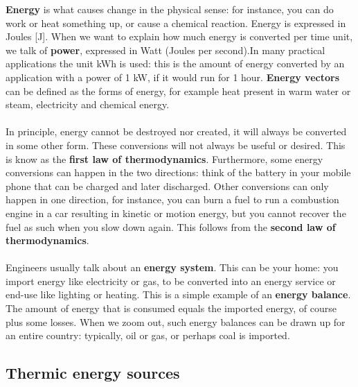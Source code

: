 \documentclass[../summary.tex]{subfiles}
\begin{document}
	\textbf{Energy} is what causes change in the physical sense: for instance, you can do work or heat something up, or cause a chemical reaction. Energy is expressed in Joules [J]. When we want to explain how much energy is converted per time unit, we talk of \textbf{power}, expressed in Watt (Joules per second).In many practical applications the unit kWh is used: this is the amount of energy converted by an application with a power of 1 kW, if it would run for 1 hour. \textbf{Energy vectors} can be defined as the forms of energy, for example heat present in warm water or steam, electricity and chemical energy.
	\\\\
	In principle, energy cannot be destroyed nor created, it will always be converted in some other form. These conversions will not always be useful or desired. This is know as the \textbf{first law of thermodynamics}. Furthermore, some energy conversions can happen in the two directions: think of the battery in your mobile phone that can be charged and later discharged. Other conversions can only happen in one direction, for instance, you can burn a fuel to run a combustion engine in a car resulting in kinetic or motion energy, but you cannot recover the fuel as such when you slow down again. This follows from the \textbf{second law of thermodynamics}.
	\\\\
	Engineers usually talk about an \textbf{energy system}. This can be your home: you import energy like electricity or gas, to be converted into an energy service or end-use like lighting or heating. This is a simple example of an \textbf{energy balance}. The amount of energy that is consumed equals the imported energy, of course plus some losses. When we zoom out, such energy balances can be drawn up for an entire country: typically, oil or gas, or perhaps coal is imported.
	
	\subsection{Thermic energy sources}
	
\end{document}

